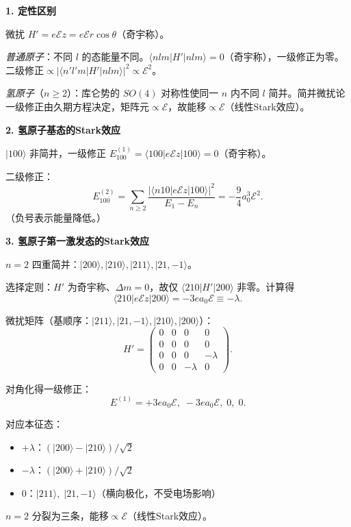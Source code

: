 \begin{derivationbox}[标准解题过程]
\textbf{1. 定性区别}

微扰 $H'=e\mathcal{E}z=e\mathcal{E}r\cos\theta$（奇宇称）。

\textit{普通原子}：不同 $l$ 的态能量不同。$\langle nlm|H'|nlm\rangle=0$（奇宇称），一级修正为零。二级修正$\propto|\langle n'l'm|H'|nlm\rangle|^2\propto\mathcal{E}^2$。

\textit{氢原子}（$n\ge2$）：库仑势的 $SO(4)$ 对称性使同一 $n$ 内不同 $l$ 简并。简并微扰论一级修正由久期方程决定，矩阵元$\propto\mathcal{E}$，故能移$\propto\mathcal{E}$（线性Stark效应）。

\textbf{2. 氢原子基态的Stark效应}

$|100\rangle$ 非简并，一级修正 $E_{100}^{(1)}=\langle100|e\mathcal{E}z|100\rangle=0$（奇宇称）。

二级修正：
\[
E_{100}^{(2)}=\sum_{n\ge2}\frac{|\langle n10|e\mathcal{E}z|100\rangle|^2}{E_1-E_n}=-\frac{9}{4}a_0^3\mathcal{E}^2.
\]
（负号表示能量降低。）

\textbf{3. 氢原子第一激发态的Stark效应}

$n=2$ 四重简并：$|200\rangle,|210\rangle,|211\rangle,|21,-1\rangle$。

选择定则：$H'$ 为奇宇称、$\Delta m=0$，故仅 $\langle210|H'|200\rangle$ 非零。计算得
\[
\langle210|e\mathcal{E}z|200\rangle=-3ea_0\mathcal{E}\equiv-\lambda.
\]

微扰矩阵（基顺序：$|211\rangle,|21,-1\rangle,|210\rangle,|200\rangle$）：
\[
H'=\begin{pmatrix}0&0&0&0\\0&0&0&0\\0&0&0&-\lambda\\0&0&-\lambda&0\end{pmatrix}.
\]

对角化得一级修正：
\begin{equation}
\boxed{E^{(1)}=+3ea_0\mathcal{E},\;-3ea_0\mathcal{E},\;0,\;0.}
\end{equation}

对应本征态：
\begin{itemize}
    \item $+\lambda$：$(|200\rangle-|210\rangle)/\sqrt2$
    \item $-\lambda$：$(|200\rangle+|210\rangle)/\sqrt2$
    \item $0$：$|211\rangle,\;|21,-1\rangle$（横向极化，不受电场影响）
\end{itemize}

$n=2$ 分裂为三条，能移$\propto\mathcal{E}$（线性Stark效应）。
\end{derivationbox}

